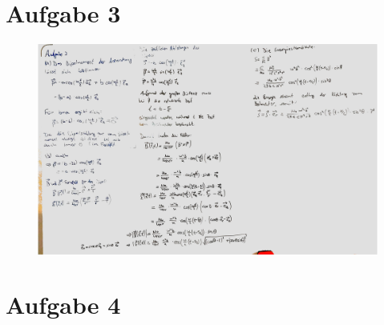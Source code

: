 \documentclass[11pt a4paper]{article}
\begin{document}
\newpage

\section*{Aufgabe 3}

\begin{figure}[H]
	\centering
	\includegraphics[width=18cm]{aufgabe3.jpg}
\end{figure}

\newpage

\section*{Aufgabe 4}
\end{document}
